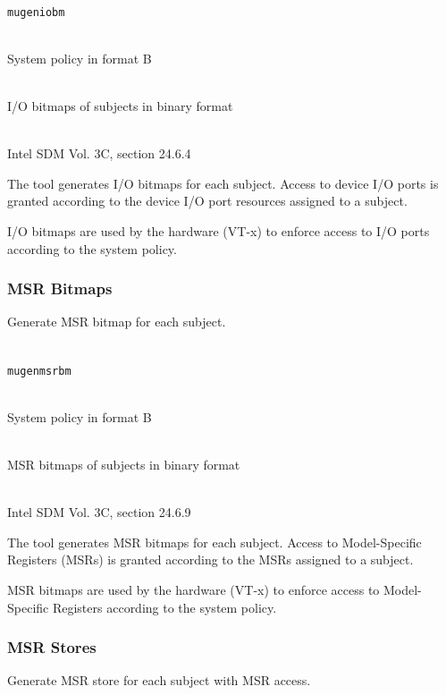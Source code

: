 \documentclass[a4paper,twoside,titlepage]{article}
\begin{document}
\begin{description} \itemsep1pt \parskip0pt
	\item[Name] \hfill \\
		\texttt{mugeniobm}
	\item[Input] \hfill \\
		System policy in format B
	\item[Output] \hfill \\
		I/O bitmaps of subjects in binary format
	\item[Output format] \hfill \\
		Intel SDM Vol. 3C, section 24.6.4
\end{description}

The tool generates I/O bitmaps for each subject. Access to device I/O ports is
granted according to the device I/O port resources assigned to a subject.

I/O bitmaps are used by the hardware (VT-x) to enforce access to I/O ports
according to the system policy.

\subsubsection{MSR Bitmaps}
Generate MSR bitmap for each subject.

\begin{description} \itemsep1pt \parskip0pt
	\item[Name] \hfill \\
		\texttt{mugenmsrbm}
	\item[Input] \hfill \\
		System policy in format B
	\item[Output] \hfill \\
		MSR bitmaps of subjects in binary format
	\item[Output format] \hfill \\
		Intel SDM Vol. 3C, section 24.6.9
\end{description}

The tool generates MSR bitmaps for each subject. Access to Model-Specific
Registers (MSRs) is granted according to the MSRs assigned to a subject.

MSR bitmaps are used by the hardware (VT-x) to enforce access to Model-Specific
Registers according to the system policy.

\subsubsection{MSR Stores}
Generate MSR store for each subject with MSR access.
\end{document}
